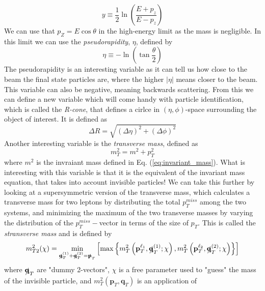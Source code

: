 \documentclass[14pt, a4paper]{book}
\begin{document}
\begin{equation}\label{eq:rapidity}
    y \equiv \frac{1}{2}\ln\left(\frac{E+p_z}{E-p_z}\right)  
\end{equation} 
We can use that $p_Z = E\cos\theta$ in the high-energy limit as the mass is negligible. In this limit we can use the \textit{pseudorapidity}, $\eta$, defined by
\begin{equation}\label{eq:pseudorapidity}
    \eta \equiv -\ln\left(\tan\frac{\theta}{2}\right)
\end{equation}
The pseudorapidity is an interesting variable as it can tell us how close to the beam the final state particles are, where the higher $\vert\eta\vert$ means closer to the beam. This variable can also be negative, meaning backwards scattering. 
From this we can define a new variable which will come handy with particle identification, which is called the \textit{R-cone}, that defines a cirlce in $(\eta,\phi)$-space surrounding the object of interest. It is defined as
\begin{equation}\label{eq:R-cone}
    \Delta R = \sqrt{(\Delta\eta)^2+(\Delta\phi)^2}
\end{equation}
Another interesting variable is the \textit{transverse mass}, defined as
\begin{equation}\label{eq:transverse_mass}
    m_T^2 = m^2 + p_T^2
\end{equation}
where $m^2$ is the invraiant mass defined in Eq. (\ref{eq:invariant_mass}). What is interesting with this variable is that it is the equivalent of the invariant mass equation, that takes into account invisible particles! 
We can take this further by looking at a supersymmetric version of the transverse mass, which calculates a transverse mass for two leptons by distributing the total $p_T^{miss}$ among the two systems, 
and minimizing the maximum of the two transverse masses by varying the distribution of the $p_T^{miss}-$vector in terms of the size of $p_T$. This is called the \textit{stransverse mass} and is defined by
\begin{equation}
    m_{T2}^2(\chi) = \underset{\slashed{\mathbf{q}}^{(1)}_T + \slashed{\mathbf{q}}^{(2)}_T = \slashed{\mathbf{p}}_T}{\min}
    \left[\max \left\{m_T^2\left(\mathbf{p}_T^{\ell_1}, \slashed{\mathbf{q}}^{(1)}_T;\chi\right), m_T^2\left(\mathbf{p}_T^{\ell_2}, \slashed{\mathbf{q}}^{(2)}_T;\chi\right) 
    \right\}\right] 
\end{equation}
where $\slashed{\mathbf{q}}_T$ are "dummy 2-vectors", $\chi$ is a free parameter used to "guess" the mass of the invisible particle, and $m_T^2\left(\mathbf{p}_T, \mathbf{q}_T\right)$ is an application of 
\end{document}
